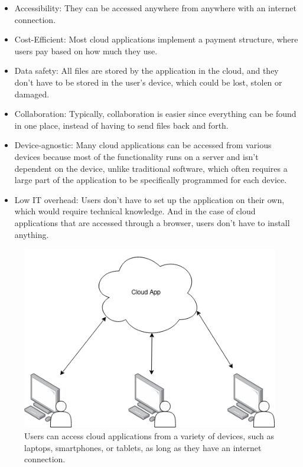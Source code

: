 \begin{itemize}
	\item Accessibility: They can be accessed anywhere from anywhere with an internet connection.
	\item Cost-Efficient: Most cloud applications implement a payment structure, where
	      users pay based on how much they use.
	\item Data safety: All files are stored by the application in the cloud, and they don't
	      have to be stored in the user's device, which could be lost, stolen or damaged.
	\item Collaboration: Typically, collaboration is easier since everything can be found
	      in one place, instead of having to send files back and forth.
	\item Device-agnostic: Many cloud applications can be accessed from various devices because most
	      of the functionality runs on a server and isn't dependent on the device, unlike
	      traditional software, which often requires a large part of the application to be
	      specifically programmed for each device.
	\item Low IT overhead: Users don't have to set up the application on their own, which
	      would require technical knowledge. And in the case of cloud applications that are
	      accessed through a browser, users don't have to install anything.
\end{itemize}

\begin{figure}[H]
	\centering
	\includegraphics[scale=0.5]{images/basic-cloud-services.drawio.png}
	\caption{Users can access cloud applications from a variety of devices, such as laptops, smartphones, or tablets, as long as they have an internet connection.}
	\label{fig:cloud-applications}
	\vspace{-1em} %
\end{figure}

